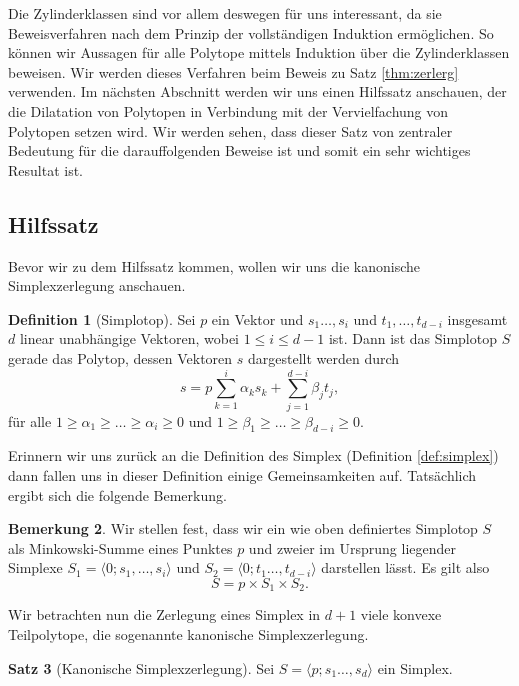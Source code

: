 \documentclass[11pt,titlepage]{article}
\theoremstyle{definition}
\newtheorem{theorem}{Satz}[section]
\newtheorem{definition}[theorem]{Definition}
\newtheorem{remark}[theorem]{Bemerkung}
\theoremstyle{remark}
\begin{document}
	Die Zylinderklassen sind vor allem deswegen für uns interessant, da sie 
	Beweisverfahren nach dem Prinzip der vollständigen Induktion ermöglichen. 
	So können wir Aussagen für alle Polytope mittels Induktion über die 
	Zylinderklassen beweisen. Wir werden dieses Verfahren beim Beweis zu Satz 
	\ref{thm:zerlerg} verwenden. Im nächsten Abschnitt werden wir uns 
	einen Hilfssatz anschauen, der die Dilatation von Polytopen 
	in Verbindung mit der Vervielfachung von Polytopen setzen wird. 
	Wir werden sehen, dass dieser Satz von zentraler Bedeutung für 
	die darauffolgenden Beweise ist und somit ein sehr wichtiges Resultat ist. 
	
	\subsection{Hilfssatz}
	
	Bevor wir zu dem Hilfssatz kommen, wollen wir uns die kanonische 
	Simplexzerlegung anschauen. 
	
	\begin{definition}[Simplotop]
		Sei $p$ ein Vektor und  $s_1\ldots,s_i$ und 
		$t_1,\ldots,t_{d-i}$ insgesamt 
		$d$ linear unabhängige Vektoren, wobei $1\leq i\leq d-1$ ist. Dann ist 
		das Simplotop $S$ gerade das Polytop, dessen Vektoren $s$ 
		dargestellt werden durch
		\[s=p\sum_{k=1}^i \alpha_k s_k +\sum_{j=1}^{d-i}\beta_j t_j,\]
		für alle $1\geq \alpha_1\geq\ldots\geq\alpha_i\geq 0$ und 
		$1\geq \beta_1\geq\ldots\geq\beta_{d-i}\geq 0$.
	\end{definition}
	
	Erinnern wir uns zurück an die Definition des Simplex (Definition \ref{def:simplex}) dann fallen uns in dieser Definition einige Gemeinsamkeiten 
	auf. Tatsächlich ergibt sich die folgende Bemerkung.
	
	\begin{remark}
		Wir stellen fest, dass wir ein wie oben definiertes Simplotop $S$ 
		als Minkowski-Summe eines Punktes $p$ und zweier 
		im Ursprung liegender Simplexe $S_1=\langle 0;s_1,\ldots,s_i\rangle$ 
		und $S_2=\langle 0;t_1\ldots,t_{d-i}\rangle$ darstellen lässt. 
		Es gilt also 
		\[S=p\times S_1 \times S_2.\]
	\end{remark}
	
	Wir betrachten nun die Zerlegung eines Simplex in $d+1$ viele konvexe 
	Teilpolytope, die sogenannte kanonische Simplexzerlegung. 
	
	\begin{theorem}[Kanonische Simplexzerlegung]
		Sei $S=\langle p;s_1\ldots,s_d\rangle$ ein Simplex. 
	\end{theorem}
	
\end{document}
